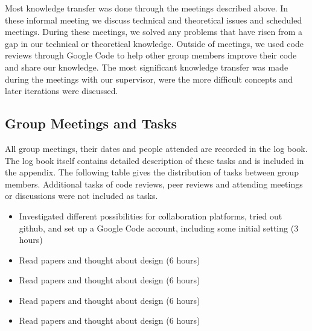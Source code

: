 Most knowledge transfer was done through the meetings described above. In these informal meeting we discuss technical and theoretical issues
and scheduled meetings. During these meetings, we solved any problems that have risen
from a gap in our technical or theoretical knowledge. Outside of meetings, we used code
reviews through Google Code to help other group members improve their code and share
our knowledge. The most significant knowledge transfer was made during the meetings with our supervisor, were the more difficult concepts and later iterations were discussed.

\subsection*{Group Meetings and Tasks}

All group meetings, their dates and people attended are recorded in the log book. The log book itself contains detailed description of these tasks and is included in the appendix. The following table gives the distribution of tasks between group members. Additional tasks of code reviews, peer reviews and attending meetings or discussions were not included as tasks.

%
{ \begin{itemize} 
    \item Investigated different possibilities for collaboration platforms,
tried out github, and set up a Google Code account, including some
initial setting (3 hours)
    \item Read papers and thought about design (6 hours)
 \end{itemize} 
}%
{ \begin{itemize} 
    \item Read papers and thought about design (6 hours)
 \end{itemize} 
}%
{ \begin{itemize} 
    \item Read papers and thought about design (6 hours)
 \end{itemize} 
}%
{ \begin{itemize} 
    \item Read papers and thought about design (6 hours)
 \end{itemize} 
}%

